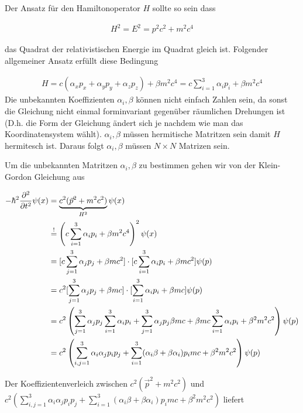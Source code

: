 Der Ansatz für den Hamiltonoperator \(H\) sollte so sein dass

\begin{align}
  \label{eq:4}
  H^2 = E^2 = p^2c^2+ m^2c^4
\end{align}

das Quadrat der relativistischen Energie im Quadrat gleich ist. Folgender allgemeiner Ansatz erfüllt diese Bedingung

\begin{align}
  \label{eq:5}
  H = c (\alpha_x p_x + \alpha_y p_y + \alpha_z p_z) + \beta m^2c^4 = c\sum_{i=1}^3\alpha_i p_i   + \beta m^2c^4
\end{align}
Die unbekannten Koeffizienten \(\alpha_i,\beta\) können nicht einfach Zahlen sein, da sonst die Gleichung nicht einmal forminvariant gegenüber räumlichen Drehungen ist (D.h. die Form der Gleichung ändert sich je nachdem wie man das Koordinatensystem wählt). \(\alpha_i,\beta\) müssen hermitische Matritzen sein damit \(H\) hermitesch ist. Daraus folgt  \(\alpha_i,\beta\) müssen \(N\times N\) Matrizen sein.

Um die unbekannten Matritzen  \(\alpha_i,\beta\) zu bestimmen gehen wir von der Klein-Gordon Gleichung aus

\begin{align}
  \label{eq:6}
  -\hbar^2 \pdiff^2_t \psi(x) &= \underbrace{c^2(\vec p^2 + m^2c^2)}_{H^2}\psi(x)\\
 &\stackrel{!}= \left(  c\sum_{i=1}^3\alpha_i p_i   + \beta m^2c^4 \right)^2\psi(x)\\
&=[c \sum_{j=1}^3 \alpha_jp_j+\beta mc^2] \cdot [c \sum_{i=1}^3 \alpha_ip_i+\beta mc^2]\psi(p) \\
&=c^2 [ \sum_{j=1}^3 \alpha_jp_j+\beta mc] \cdot [ \sum_{i=1}^3 \alpha_ip_i+\beta mc]\psi(p) \\
&=c^2 \left( \sum_{j=1}^3 \alpha_jp_j\sum_{i=1}^3 \alpha_ip_i  +   \sum_{j=1}^3 \alpha_jp_j \beta mc  + \beta mc \sum_{i=1}^3 \alpha_ip_i+ \beta^2 m^2c^2\right)\psi(p) \\
&= c^2\left(\sum_{i,j=1}^3\alpha_i\alpha_j p_ip_j+\sum_{i=1}^3(\alpha_i\beta+\beta\alpha_i)p_i mc +  \beta^2m^2c^2\right)\psi(p)
\end{align}

Der Koeffizientenverleich zwischen \(c^2(\vec p^2 + m^2c^2)\) und \( c^2\left(\sum_{i,j=1}^3\alpha_i\alpha_j p_ip_j+\sum_{i=1}^3(\alpha_i\beta+\beta\alpha_i)p_i mc +  \beta^2m^2c^2\right)\) liefert

